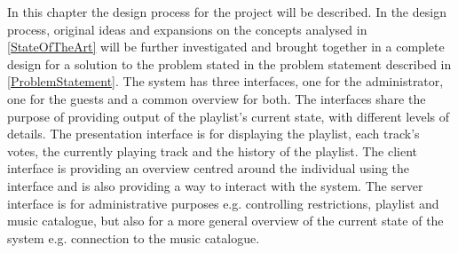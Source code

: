 In this chapter the design process for the project will be described. In the design process, original ideas and expansions on the concepts analysed in \cref{StateOfTheArt} will be further investigated and brought together in a complete design for a solution to the problem stated in the problem statement described in \cref{ProblemStatement}. The system has three interfaces, one for the administrator, one for the guests and a common overview for both. The interfaces share the purpose of providing output of the playlist's current state, with different levels of details. The presentation interface is for displaying the playlist, each track's votes, the currently playing track and the history of the playlist. The client interface is providing an overview centred around the individual using the interface and is also providing a way to interact with the system. The server interface is for administrative purposes e.g. controlling restrictions, playlist and music catalogue, but also for a more general overview of the current state of the system e.g. connection to the music catalogue.
